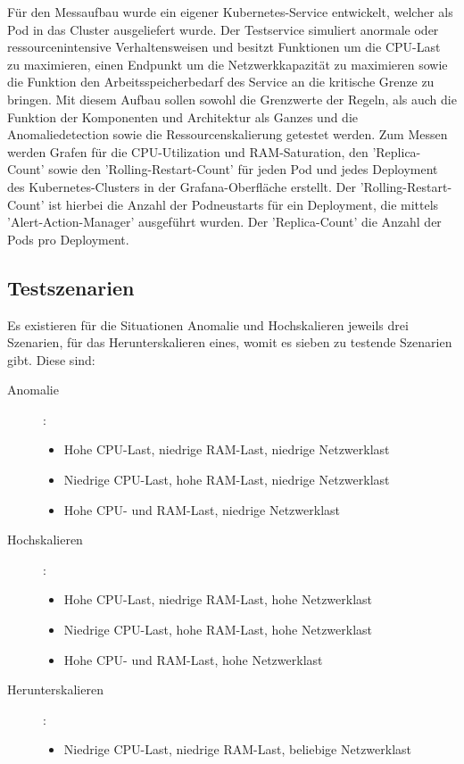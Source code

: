 \documentclass[a4paper,10pt]{scrartcl}
\begin{document}
Für den Messaufbau wurde ein eigener Kubernetes-Service entwickelt, welcher als Pod in das Cluster ausgeliefert wurde. Der Testservice simuliert anormale oder ressourcenintensive Verhaltensweisen und besitzt Funktionen um die CPU-Last zu maximieren, einen Endpunkt um die Netzwerkkapazität zu maximieren sowie die Funktion den Arbeitsspeicherbedarf des Service an die kritische Grenze zu bringen.
Mit diesem Aufbau sollen sowohl die Grenzwerte der Regeln, als auch die Funktion der Komponenten und Architektur als Ganzes und die Anomaliedetection sowie die Ressourcenskalierung getestet werden.
Zum Messen werden Grafen für die CPU-Utilization und RAM-Saturation, den 'Replica-Count' sowie den 'Rolling-Restart-Count' für jeden Pod und jedes Deployment des Kubernetes-Clusters in der Grafana-Oberfläche erstellt. Der 'Rolling-Restart-Count' ist hierbei die Anzahl der Podneustarts für ein Deployment, die mittels 'Alert-Action-Manager' ausgeführt wurden. Der 'Replica-Count' die Anzahl der Pods pro Deployment.

\subsection{Testszenarien}

Es existieren für die Situationen Anomalie und Hochskalieren jeweils drei Szenarien, für das Herunterskalieren eines, womit es sieben zu testende Szenarien gibt.
Diese sind:

\begin{description}
\item[Anomalie]:
\begin{itemize}
\item Hohe CPU-Last, niedrige RAM-Last, niedrige Netzwerklast
\item Niedrige CPU-Last, hohe RAM-Last, niedrige Netzwerklast
\item Hohe CPU- und RAM-Last, niedrige Netzwerklast
\end{itemize}
\item[Hochskalieren]:
\begin{itemize}
\item Hohe CPU-Last, niedrige RAM-Last, hohe Netzwerklast
\item Niedrige CPU-Last, hohe RAM-Last, hohe Netzwerklast
\item Hohe CPU- und RAM-Last, hohe Netzwerklast
\end{itemize}
\item[Herunterskalieren]:
\begin{itemize}
\item Niedrige CPU-Last, niedrige RAM-Last, beliebige Netzwerklast
\end{itemize}
\end{description}
\end{document}
